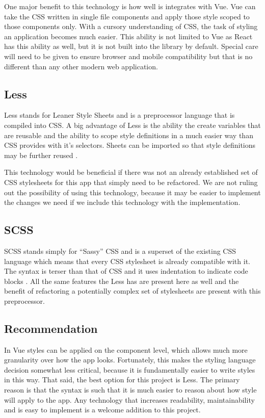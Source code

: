 \documentclass[draftclsnofoot,onecolumn,journal,letterpaper,compsoc,10pt]{IEEEtran}
\begin{document}
        One major benefit to this technology is how well is integrates with Vue. Vue can take the CSS written in single file components and apply those style scoped to those components only. With a cursory understanding of CSS, the task of styling an application becomes much easier. This ability is not limited to Vue as React has this ability as well, but it is not built into the library by default. Special care will need to be given to ensure browser and mobile compatibility but that is no different than any other modern web application.

        \subsection{Less}
        Less stands for Leaner Style Sheets and is a preprocessor language that is compiled into CSS. A big advantage of Less is the ability the create variables that are reusable and the ability to scope style definitions in a much easier way than CSS provides with it’s selectors. Sheets can be imported so that style definitions may be further reused \cite{less}. 
        
        This technology would be beneficial if there was not an already established set of CSS stylesheets for this app that simply need to be refactored. We are not ruling out the possibility of using this technology, because it may be easier to implement the changes we need if we include this technology with the implementation.
        
        \subsection{SCSS}
        SCSS stands simply for “Sassy” CSS and is a superset of the existing CSS language which means that every CSS stylesheet is already compatible with it. The syntax is terser than that of CSS and it uses indentation to indicate code blocks \cite{sass}. All the same features the Less has are present here as well and the benefit of refactoring a potentially complex set of stylesheets are present with this preprocessor. 
        
        \subsection{Recommendation}
        In Vue styles can be applied on the component level, which allows much more granularity over how the app looks. Fortunately, this makes the styling language decision somewhat less critical, because it is fundamentally easier to write styles in this way. That said, the best option for this project is Less. The primary reason is that the syntax is such that it is much easier to reason about how style will apply to the app. Any technology that increases readability, maintainability and is easy to implement is a welcome addition to this project.
        
\end{document}
